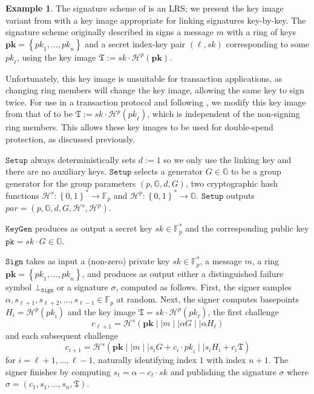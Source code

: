 \documentclass{mrl}
\theoremstyle{plain}
\theoremstyle{definition}
\newtheorem{example}{Example}[section]
\begin{document}
\begin{example}\label{ex:lsag}
The signature scheme of \cite{liu} is an LRS; we present the key image variant from \cite{van2013cryptonote} with a key image appropriate for linking signatures key-by-key.  The signature scheme originally described in \cite{liu} signs a message $m$ with a ring of keys $\textbf{pk} = \left\{\textit{pk}_1, \ldots, \textit{pk}_n\right\}$ and a secret index-key pair $(\ell, \textit{sk})$ corresponding to some $\textit{pk}_\ell$, using the key image $\mathfrak{T} := \textit{sk} \cdot \mathcal{H}^p(\textbf{pk})$. 

Unfortunately, this key image is unsuitable for transaction applications, as changing ring members will change the key image, allowing the same key to sign twice. For use in a transaction protocol and following \cite{van2013cryptonote}, we modify this key image from that of \cite{liu} to be $\mathfrak{T} := \textit{sk} \cdot  \mathcal{H}^p(\textit{pk}_\ell)$, which is independent of the non-signing ring members. This allows these key images to be used for double-spend protection, as discussed previously.

$\texttt{Setup}$ always deterministically sets $d:=1$ so we only use the linking key and there are no auxiliary keys. $\texttt{Setup}$ selects a generator $G \in \mathbb{G}$ to be a group generator for the group parameters $(p, \mathbb{G}, d, G)$, two cryptographic hash functions $\mathcal{H}^s:\left\{0,1\right\}^* \to \mathbb{F}_p$ and $\mathcal{H}^p:\left\{0,1\right\}^* \to \mathbb{G}$. $\texttt{Setup}$ outputs $\textit{par} = (p, \mathbb{G}, d, G, \mathcal{H}^s, \mathcal{H}^p)$. 

$\texttt{KeyGen}$ produces as output a secret key $\textit{sk} \in \mathbb{F}_p^*$ and the corresponding public key $\texttt{pk} = \textit{sk}\cdot G\in \mathbb{G}$. 

$\texttt{Sign}$ takes as input a (non-zero) private key $\textit{sk} \in \mathbb{F}_p^*$, a message $m$, a ring $\textbf{pk} = \left\{\textit{pk}_1, \ldots, \textit{pk}_n\right\}$, and produces as output either a distinguished failure symbol $\bot_{\texttt{Sign}}$ or a signature $\sigma$, computed as follows. First, the signer samples $\alpha, s_{\ell+1}, s_{\ell+2}, \ldots, s_{\ell-1} \in \mathbb{F}_p$ at random. Next, the signer computes basepoints $H_i = \mathcal{H}^p(\textit{pk}_i)$ and the key image $\mathfrak{T} = \textit{sk} \cdot \mathcal{H}^p(\textit{pk}_\ell)$, the first challenge $$c_{\ell+1}  = \mathcal{H}^s(\textbf{pk} \mid \mid m \mid \mid \alpha G \mid \mid \alpha H_\ell)$$ and each subsequent challenge $$c_{i+1} = \mathcal{H}^s(\textbf{pk} \mid \mid m \mid \mid s_i G + c_i \cdot \textit{pk}_i \mid \mid s_i H_i + c_i \mathfrak{T})$$ for $i = \ell+1, \ldots, \ell-1$, naturally identifying index $1$ with index $n+1$. The signer finishes by computing $s_\ell = \alpha - c_\ell \cdot \textit{sk}$ and publishing the signature $\sigma$ where $\sigma = (c_1, s_1, \ldots, s_n, \mathfrak{T})$.


\end{example}
\end{document}
